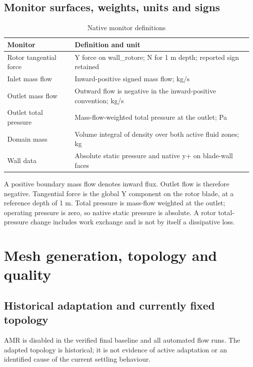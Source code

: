 \documentclass[11pt,a4paper]{article}
\begin{document}
\subsection{Monitor surfaces, weights, units and signs}
\par
\begin{table}[!htbp]
\centering
\caption{Native monitor definitions}
\label{tab:4}
\small\renewcommand{\arraystretch}{1.16}
\begin{tabularx}{\linewidth}{@{}>{\raggedright\arraybackslash}X >{\raggedright\arraybackslash}X@{}}
\toprule
\textbf{Monitor} & \textbf{Definition and unit} \\
\midrule
Rotor tangential force & Y force on wall\_rotore; N for 1 m depth; reported sign retained \\
Inlet mass flow & Inward-positive signed mass flow; kg/s \\
Outlet mass flow & Outward flow is negative in the inward-positive convention; kg/s \\
Outlet total pressure & Mass-flow-weighted total pressure at the outlet; Pa \\
Domain mass & Volume integral of density over both active fluid zones; kg \\
Wall data & Absolute static pressure and native y+ on blade-wall faces \\
\bottomrule
\end{tabularx}
\end{table}
\par
A positive boundary mass flow denotes inward flux. Outlet flow is therefore negative. Tangential force is the global Y component on the rotor blade, at a reference depth of 1 m. Total pressure is mass-flow weighted at the outlet; operating pressure is zero, so native static pressure is absolute. A rotor total-pressure change includes work exchange and is not by itself a dissipative loss.\par

\FloatBarrier
\section{Mesh generation, topology and quality}
\subsection{Historical adaptation and currently fixed topology}
AMR is disabled in the verified final baseline and all automated flow runs. The adapted topology is historical; it is not evidence of active adaptation or an identified cause of the current settling behaviour.\par
\end{document}
